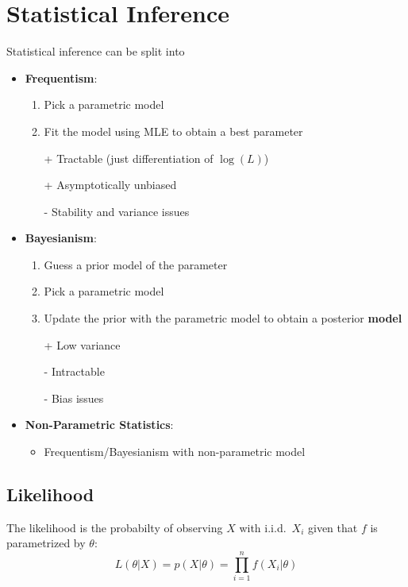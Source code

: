 \section{Statistical Inference}
Statistical inference can be split into
\begin{itemize}
    \item \textbf{Frequentism}:
          \begin{enumerate}
              \item Pick a parametric model
              \item Fit the model using MLE to obtain a best parameter
          \end{enumerate}
          \newpar{}
          \begin{itemize}
              \item[+] Tractable (just differentiation of $\log(L)$)
              \item[+] Asymptotically unbiased
              \item[-] Stability and variance issues
          \end{itemize}
          \newpar{}
    \item \textbf{Bayesianism}:
          \begin{enumerate}
              \item Guess a prior model of the parameter
              \item Pick a parametric model
              \item Update the prior with the parametric model to obtain a posterior \textbf{model}
          \end{enumerate}
          \newpar{}
          \begin{itemize}
              \item[+] Low variance
              \item[-] Intractable
              \item[-] Bias issues
          \end{itemize}
    \item \textbf{Non-Parametric Statistics}:
          \begin{itemize}
              \item Frequentism/Bayesianism with non-parametric model
          \end{itemize}
\end{itemize}

\subsection{Likelihood}
The likelihood is the probabilty of observing $X$ with i.i.d.\ $X_i$ given that $f$ is parametrized by $\theta$:
\noindent\begin{equation*}
    L(\theta|X) = p(X|\theta) = \prod_{i=1}^{n} f(X_i|\theta)
\end{equation*}

